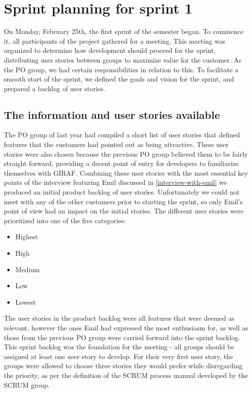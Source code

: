 \section{Sprint planning for sprint 1}
On Monday, February 25th, the first sprint of the semester began.
To commence it, all participants of the project gathered for a meeting.
This meeting was organized to determine how development should proceed for the sprint, distributing user stories between groups to maximize value for the customer.
As the PO group, we had certain responsibilities in relation to this.
To facilitate a smooth start of the sprint, we defined the goals and vision for the sprint, and prepared a backlog of user stories.

\subsection{The information and user stories available}
The PO group of last year had compiled a short list of user stories that defined features that the customers had pointed out as being attractive.
These user stories were also chosen because the previous PO group believed them to be fairly straight forward, providing a decent point of entry for developers to familiarize themselves with GIRAF.
Combining these user stories with the most essential key points of the interview featuring Emil discussed in \autoref{interview-with-emil} we produced an initial product backlog of user stories.
Unfortunately we could not meet with any of the other customers prior to starting the sprint, so only Emil's point of view had an impact on the initial stories.
The different user stories were prioritized into one of the five categories:
\begin{itemize}
    \item Highest
    \item High
    \item Medium
    \item Low
    \item Lowest
\end{itemize}

\noindent
The user stories in the product backlog were all features that were deemed as relevant, however the ones Emil had expressed the most enthusiasm for, as well as those from the previous PO group were carried forward into the sprint backlog.
This sprint backlog was the foundation for the meeting - all groups should be assigned at least one user story to develop.
For their very first user story, the groups were allowed to choose three stories they would prefer while disregarding the priority, as per the definition of the SCRUM process manual developed by the SCRUM group.

